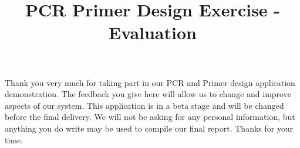 \documentclass[A4paper]{article}
\title{PCR Primer Design Exercise - Evaluation}
\date{}
\begin{document}
\maketitle

Thank you very much for taking part in our PCR and Primer design application demonstration. The feedback you give here will allow us to change and improve aspects of our system. This application is in a beta stage and will be changed before the final delivery. We will not be asking for any personal information, but anything you do write may be used to compile our final report. Thanks for your time. \\ \\ \\ \\

\end{document}
